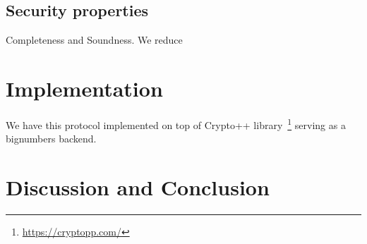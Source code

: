 \documentclass{llncs}
\begin{document}
\subsection{Security properties}

Completeness and Soundness.
We reduce

\section{Implementation}

We have this protocol implemented on top of {Crypto++} library~\footnote{\url{https://cryptopp.com/}}
serving as a bignumbers backend.

\section{Discussion and Conclusion}




\end{document}
